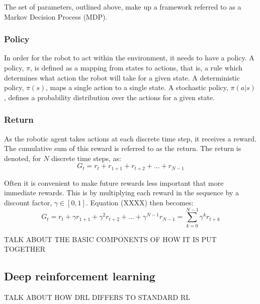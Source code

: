 \documentclass[12pt, a4paper]{article}
\begin{document}
The set of parameters, outlined above, make up a framework referred to as a Markov Decision Process (MDP).

\subsubsection{Policy}
In order for the robot to act within the environment, it needs to have a policy. A policy, $\pi$, is defined as a mapping from states to actions, that is, a rule which determines what action the robot will take for a given state. A deterministic policy, $\pi (s)$, maps a single action to a single state. A stochastic policy, $\pi (a | s)$, defines a probability distribution over the actions for a given state.

\subsubsection{Return}
As the robotic agent takes actions at each discrete time step, it receives a reward. The cumulative sum of this reward is referred to as the return. The return is denoted, for $N$ discrete time steps, as:
\begin{equation}
G_t = r_t + r_{1+1} + r_{t+2} + \ldots + r_{N-1}
\end{equation}

Often it is convenient to make future rewards less important that more immediate rewards. This is by multiplying each reward in the sequence by a discount factor, $\gamma \in [0,1]$. Equation (XXXX) then becomes:
\begin{equation}
G_t = r_t + \gamma r_{1+1} + \gamma^2 r_{t+2} + \ldots + \gamma^{N-1} r_{N-1} = \sum_{k = 0}^{N-1} \gamma^k r_{t+k}
\end{equation}



TALK ABOUT THE BASIC COMPONENTS OF HOW IT IS PUT TOGETHER



\subsection{Deep reinforcement learning}

TALK ABOUT HOW DRL DIFFERS TO STANDARD RL
\end{document}
